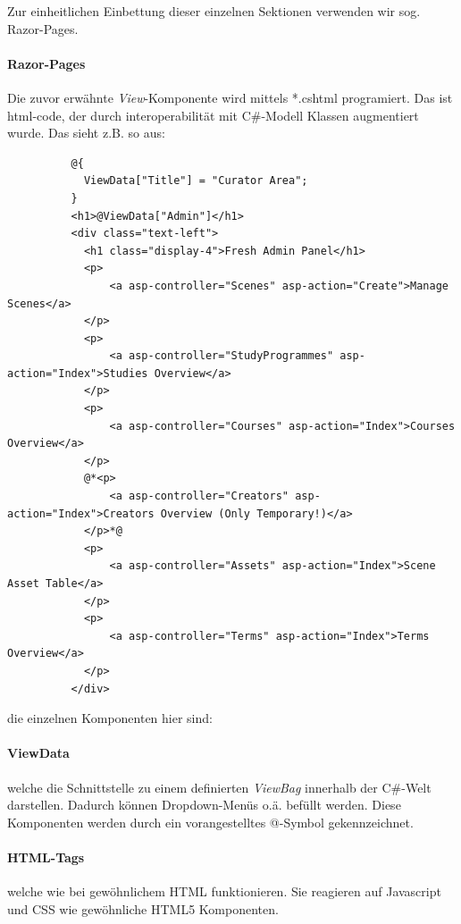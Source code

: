 \documentclass[titlepage, a4paper, 11pt]{scrartcl}
\begin{document}
          Zur einheitlichen Einbettung dieser einzelnen Sektionen verwenden wir sog. Razor-Pages.

        \paragraph{Razor-Pages}

        Die zuvor erwähnte \textit{View}-Komponente wird mittels *.cshtml programiert. Das ist html-code, der durch interoperabilität mit C\#-Modell Klassen augmentiert wurde.
        Das sieht z.B. so aus:

        \begin{lstlisting}          
          @{
            ViewData["Title"] = "Curator Area";
          }
          <h1>@ViewData["Admin"]</h1>
          <div class="text-left">
            <h1 class="display-4">Fresh Admin Panel</h1>
            <p>
                <a asp-controller="Scenes" asp-action="Create">Manage Scenes</a>
            </p>
            <p>
                <a asp-controller="StudyProgrammes" asp-action="Index">Studies Overview</a>
            </p>
            <p>
                <a asp-controller="Courses" asp-action="Index">Courses Overview</a>
            </p>
            @*<p>
                <a asp-controller="Creators" asp-action="Index">Creators Overview (Only Temporary!)</a>
            </p>*@
            <p>
                <a asp-controller="Assets" asp-action="Index">Scene Asset Table</a>
            </p>
            <p>
                <a asp-controller="Terms" asp-action="Index">Terms Overview</a>
            </p>
          </div>
        \end{lstlisting}
        
        die einzelnen Komponenten hier sind:

        \paragraph{ViewData} welche die Schnittstelle zu einem definierten \textit{ViewBag} innerhalb der C\#-Welt darstellen. Dadurch können Dropdown-Menüs o.ä. befüllt werden.
        Diese Komponenten werden durch ein vorangestelltes @-Symbol gekennzeichnet.

        \paragraph{HTML-Tags} welche wie bei gewöhnlichem HTML funktionieren. Sie reagieren auf Javascript und CSS wie gewöhnliche HTML5 Komponenten.
\end{document}
